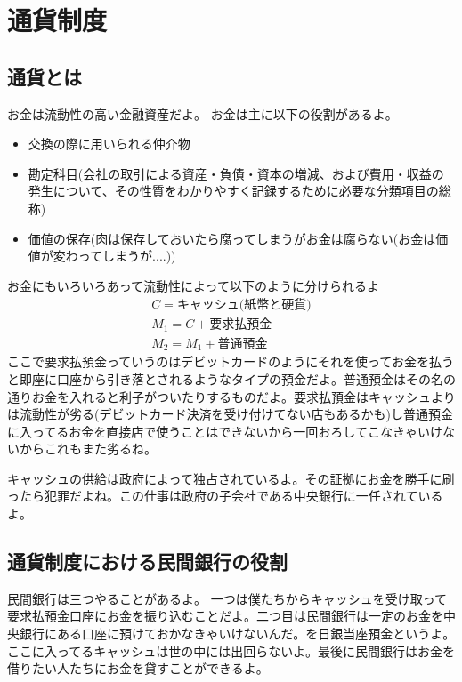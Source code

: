 \documentclass[a4paper, 12pt]{article}
\begin{document}
\newpage

\section{通貨制度}
\subsection{通貨とは}
お金は流動性の高い金融資産だよ。
お金は主に以下の役割があるよ。
\begin{itemize}
  \item 交換の際に用いられる仲介物
  \item 勘定科目(会社の取引による資産・負債・資本の増減、および費用・収益の発生について、その性質をわかりやすく記録するために必要な分類項目の総称)
  \item 価値の保存(肉は保存しておいたら腐ってしまうがお金は腐らない(お金は価値が変わってしまうが....))
\end{itemize}
お金にもいろいろあって流動性によって以下のように分けられるよ
\begin{displaymath}
  \begin{array}{l}
    C=\text{キャッシュ(紙幣と硬貨)}\\
    M_1=C+\text{要求払預金}\\
    M_2=M_1+\text{普通預金}
  \end{array}
\end{displaymath}
ここで要求払預金っていうのはデビットカードのようにそれを使ってお金を払うと即座に口座から引き落とされるようなタイプの預金だよ。普通預金はその名の通りお金を入れると利子がついたりするものだよ。要求払預金はキャッシュよりは流動性が劣る(デビットカード決済を受け付けてない店もあるかも)し普通預金に入ってるお金を直接店で使うことはできないから一回おろしてこなきゃいけないからこれもまた劣るね。

キャッシュの供給は政府によって独占されているよ。その証拠にお金を勝手に刷ったら犯罪だよね。この仕事は政府の子会社である中央銀行に一任されているよ。
\subsection{通貨制度における民間銀行の役割}
民間銀行は三つやることがあるよ。
一つは僕たちからキャッシュを受け取って要求払預金口座にお金を振り込むことだよ。二つ目は民間銀行は一定のお金を中央銀行にある口座に預けておかなきゃいけないんだ。を日銀当座預金というよ。ここに入ってるキャッシュは世の中には出回らないよ。最後に民間銀行はお金を借りたい人たちにお金を貸すことができるよ。
\end{document}
